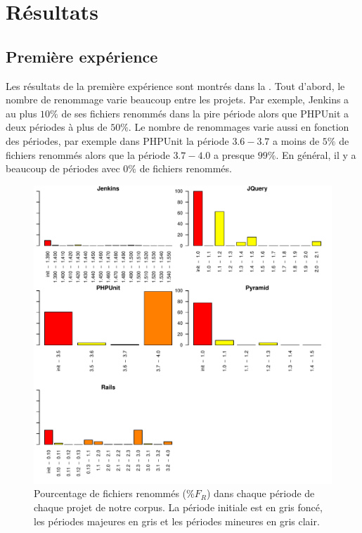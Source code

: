 \section{Résultats}
\label{sec:resultats}

\subsection{Première expérience}

Les résultats de la première expérience sont montrés dans la . Tout d'abord, le nombre de renommage varie beaucoup entre les projets. Par exemple, Jenkins a au plus $10\%$ de ses fichiers renommés dans la pire période alors que PHPUnit a deux périodes à plus de $50\%$. Le nombre de renommages varie aussi en fonction des périodes, par exemple dans PHPUnit la période $3.6 - 3.7$ a moins de $5\%$ de fichiers renommés alors que la période $3.7 - 4.0$ a presque $99\%$. En général, il y a beaucoup de périodes avec $0\%$ de fichiers renommés.\\

\begin{figure}[h]
	\centering
	\includegraphics[width=0.85\linewidth,keepaspectratio]{data/figures/renaming.pdf}
	\caption{Pourcentage de fichiers renommés ($\%F_R$) dans chaque période de chaque projet de notre corpus. La période initiale est en gris foncé, les périodes majeures en gris et les périodes mineures en gris clair.}
	\label{fig:renaming}
\end{figure}

